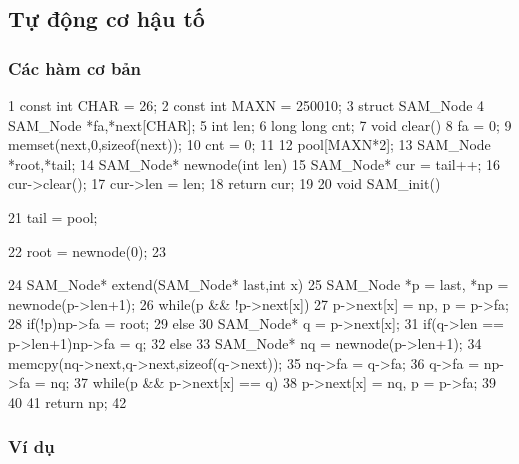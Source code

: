 \documentclass[11pt]{article}
\begin{document}
\subsection{Tự động cơ hậu tố}

\subsubsection{Các hàm cơ bản}

\begin{Code}
 1   const int CHAR = 26;
 2   const int MAXN = 250010;
 3   struct SAM_Node{
 4       SAM_Node *fa,*next[CHAR];
 5       int len;
 6       long long cnt;
 7       void clear(){
 8           fa = 0;
 9           memset(next,0,sizeof(next));
10           cnt = 0;
11       }
12   }pool[MAXN*2];
13   SAM_Node *root,*tail;
14   SAM_Node* newnode(int len){
15       SAM_Node* cur = tail++;
16       cur->clear();
17       cur->len = len;
18       return cur;
19   }
20   void SAM_init(){
21       tail = pool;


22     root = newnode(0);
23 }
24 SAM_Node* extend(SAM_Node* last,int x){
25     SAM_Node *p = last, *np = newnode(p->len+1);
26     while(p && !p->next[x])
27         p->next[x] = np, p = p->fa;
28     if(!p)np->fa = root;
29     else {
30         SAM_Node* q = p->next[x];
31         if(q->len == p->len+1)np->fa = q;
32         else {
33             SAM_Node* nq = newnode(p->len+1);
34             memcpy(nq->next,q->next,sizeof(q->next));
35             nq->fa = q->fa;
36             q->fa = np->fa = nq;
37             while(p && p->next[x] == q)
38                 p->next[x] = nq, p = p->fa;
39         }
40     }
41     return np;
42 }
\end{Code}

\subsubsection{Ví dụ}
\end{document}
